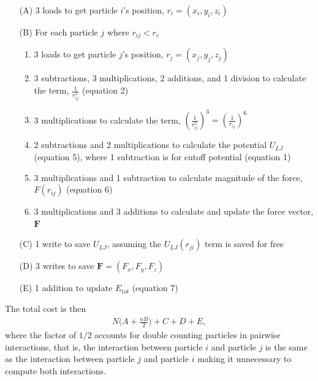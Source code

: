 \documentclass[12pt]{article}
\begin{document}
\begin{itemize}
\item[(A)] 3 loads to get particle $i$'s position, $r_i = (x_i, y_i, z_i)$
\item[(B)] For each particle $j$ where $r_{ij}<r_c$
  \begin{enumerate}
    \item 3 loads to get particle $j$'s position, $r_j = (x_j, y_j, z_j)$
    \item 3 subtractions, 3 multiplications, 2 additions, and 1 division to calculate the term, $\frac{1}{r_{ij}^2}$ 
             (equation 2)
    \item 3 multiplications to calculate the term, $\left(\frac{1}{r_{ij}^2}\right)^3 = \left(\frac{1}{r_{ij}}\right)^6$
    \item 2 subtractions and 2 multiplications to calculate the potential $U_{LJ}$ (equation 5), 
             where 1 subtraction is for cutoff potential (equation 1)
    \item 3 multiplications and 1 subtraction to calculate magnitude of the force, $F(r_{ij})$ (equation 6)
    \item 3 multiplications and 3 additions to calculate and update the force vector, $\textbf{F}$
  \end{enumerate}
\item[(C)] 1 write to save $U_{LJ}$, assuming the $U_{LJ}(r_{ji})$ term is saved for free
\item[(D)] 3 writes to save $\textbf{F} = (F_x, F_y, F_z)$
\item[(E)] 1 addition to update $E_{tot}$ (equation 7)
\end{itemize}
The total cost is then
\begin{align}
    N\bigg(A+\frac{nB}{2}\bigg)+C+D+E,
\end{align}
where the factor of $1/2$ accounts for double counting particles in pairwise interactions, 
that is, the interaction between particle $i$ and particle $j$ is the same as the interaction 
between particle $j$ and particle $i$ making it unnecessary to compute both interactions. \\
\end{document}
